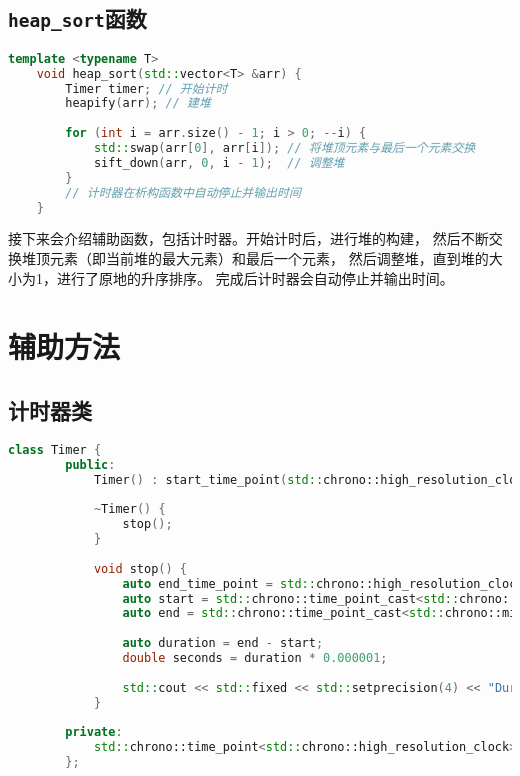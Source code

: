 \documentclass[UTF8]{ctexart}
\begin{document}
\subsection{\texttt{heap\_sort}函数}

\begin{lstlisting}[language=C++]
    template <typename T> 
    void heap_sort(std::vector<T> &arr) {
        Timer timer; // 开始计时
        heapify(arr); // 建堆
    
        for (int i = arr.size() - 1; i > 0; --i) {
            std::swap(arr[0], arr[i]); // 将堆顶元素与最后一个元素交换
            sift_down(arr, 0, i - 1);  // 调整堆
        }
        // 计时器在析构函数中自动停止并输出时间
    }
\end{lstlisting}

接下来会介绍辅助函数，包括计时器。开始计时后，进行堆的构建，
然后不断交换堆顶元素（即当前堆的最大元素）和最后一个元素，
然后调整堆，直到堆的大小为1，进行了原地的升序排序。
完成后计时器会自动停止并输出时间。

\section{辅助方法}

\subsection{计时器类}

\begin{lstlisting}[language=C++, breaklines=true]
    class Timer {
        public:
            Timer() : start_time_point(std::chrono::high_resolution_clock::now()) {}
        
            ~Timer() {
                stop();
            }
        
            void stop() {
                auto end_time_point = std::chrono::high_resolution_clock::now();
                auto start = std::chrono::time_point_cast<std::chrono::microseconds>(start_time_point).time_since_epoch().count();
                auto end = std::chrono::time_point_cast<std::chrono::microseconds>(end_time_point).time_since_epoch().count();
        
                auto duration = end - start;
                double seconds = duration * 0.000001;
        
                std::cout << std::fixed << std::setprecision(4) << "Duration: " << seconds << " seconds" << std::endl;
            }
        
        private:
            std::chrono::time_point<std::chrono::high_resolution_clock> start_time_point;
        };    
\end{lstlisting}
\end{document}
